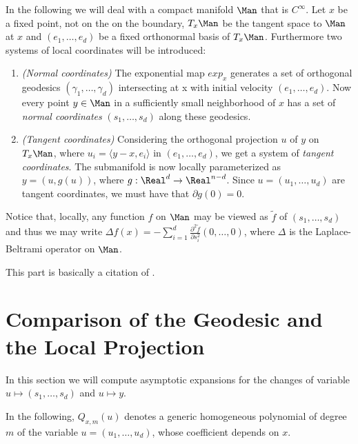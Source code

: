 In the following we will deal with a compact manifold $\Man$ that is $C^\infty$. Let $x$ be a fixed point, not on the on the boundary, $T_x\Man$ be the tangent space to $\Man$ at $x$ and $(e_1,\dots,e_d)$ be a fixed orthonormal basis of $T_x\Man$. Furthermore two systems of local coordinates will be introduced:
\begin{enumerate}
\item \textit{(Normal coordinates)} The exponential map $exp_x$ generates a set of orthogonal geodesics $(\gamma_1,\dots,\gamma_d)$ intersecting at x with initial velocity $(e_1,\dots,e_d)$. Now every point $y\in\Man$ in a sufficiently small neighborhood of $x$ has a set of \textit{normal coordinates} $(s_1,\dots,s_d)$ along these geodesics.
\item \textit{(Tangent coordinates)} Considering the orthogonal projection $u$ of $y$ on $T_x\Man$, where $u_i = \langle y-x,e_i\rangle$ in $(e_1,\dots,e_d)$, we get a system of \textit{tangent coordinates}. The submanifold is now locally parameterized as $y=(u,g(u))$, where $g:\Real^d \rightarrow \Real^{n-d}$. Since $u=(u_1,\dots,u_d)$ are tangent coordinates, we must have that $\partial g(0)=0$.
\end{enumerate}
Notice that, locally, any function $f$ on $\Man$ may be viewed as $\tilde{f}$ of $(s_1,\dots,s_d)$ and thus we may write $\Delta f(x)=-\sum_{i=1}^d \frac{\partial^2\tilde{f}}{\partial s_i^2}(0,\dots,0)$, where $\Delta$ is the Laplace-Beltrami operator on $\Man$.

This part is basically a citation of \cite{Coifman20065}.

\section{Comparison of the Geodesic and the Local Projection}
In this section we will compute asymptotic expansions for the changes of variable $u\mapsto (s_1,\dots,s_d)$ and $u\mapsto y$.

In the following, $Q_{x,m}(u)$ denotes a generic homogeneous polynomial of degree $m$ of the variable $u = (u_1,\dots,u_d)$, whose coefficient depends on $x$.

